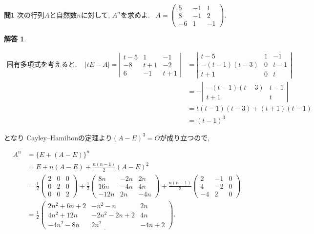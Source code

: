\documentclass{jsarticle}
\newtheorem*{answer*}{解答}
\begin{document}
\begin{itembox}[l]{\textbf{問1}}
次の行列$A$と自然数$n$に対して, $A^n$を求めよ. \ 
$A=\left(\begin{array}{ccc}
5 & -1 & 1 \\
8 & -1 & 2 \\
-6 & 1 & -1
\end{array}\right)$.
\end{itembox}

\begin{answer*}
\end{answer*}
$$
\begin{aligned}
固有多項式を考えると, \quad|t E-A|=\left|\begin{array}{ccc}
t-5 & 1 & -1 \\
-8 & t+1 & -2 \\
6 & -1 & t+1
\end{array}\right| & =\left|\begin{array}{ccc}
t-5 & 1 & -1 \\
-(t-1)(t-3) & 0 & t-1 \\
t+1 & 0 & t
\end{array}\right| \\
 & =-\left|\begin{array}{cc}
-(t-1)(t-3) & t-1 \\
t+1 & t
\end{array}\right| \\
 \quad & =t(t-1)(t-3)+(t+1)(t-1) \\
& =(t-1)^3
\end{aligned}
$$



となり Cayley–Hamiltonの定理より$(A-E)^3=O$が成り立つので, 


$$
\begin{aligned}
A^n & = \{E+(A-E)\}^n \\
&=E+n(A-E)+\frac{n(n-1)}{2}(A-E)^2 \\
&=\frac{1}{2}\left(\begin{array}{lll}
2 & 0 & 0 \\
0 & 2 & 0 \\
0 & 0 & 2
\end{array}\right)+\frac{1}{2}\left(\begin{array}{ccc}
8 n & -2 n & 2 n \\
16 n & -4 n & 4 n \\
-12 n & 2 n & -4 n
\end{array}\right)+\frac{n(n-1)}{2}\left(\begin{array}{ccc}
2 & -1 & 0 \\
4 & -2 & 0 \\
-4 & 2 & 0
\end{array}\right) \\
&= \underline{\frac{1}{2}\left(\begin{array}{lll}
2n^2+6n+2 & -n^2-n & 2n \\
4n^2+12n & -2n^2-2n+2 & 4n \\
-4n^2-8n & 2n^2 & -4n+2
\end{array}\right)}.
\end{aligned}
$$
\end{document}
